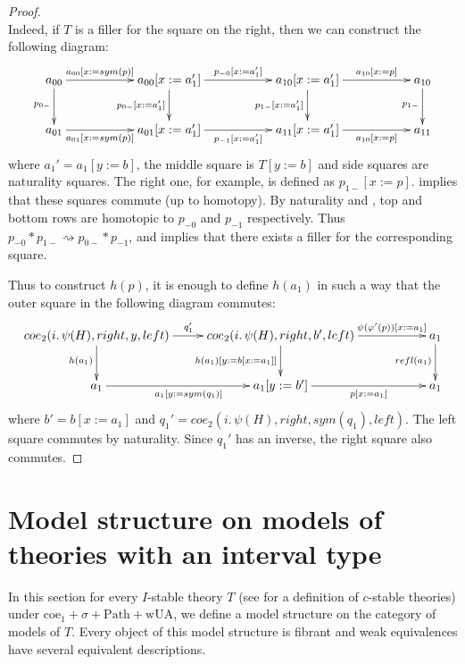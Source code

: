 \documentclass[reqno]{amsart}
\theoremstyle{definition}
\theoremstyle{remark}
\newcommand{\repl}{:=}
\newcommand{\idtype}{\rightsquigarrow}
\newcommand{\wUA}{\mathrm{wUA}}
\newcommand{\coe}{\mathrm{coe}}
\newcommand{\Path}{\mathrm{Path}}
\numberwithin{figure}{section}
\begin{document}
\begin{proof}
\[{            } \]
Indeed, if $T$ is a filler for the square on the right, then we can construct the following diagram:
\[ \xymatrix{ a_{00} \ar[rr]^-{a_{00}[x \repl sym(p)]} \ar[d]_{p_{0-}} & & a_{00}[x \repl a_1'] \ar[rr]^{p_{-0}[x \repl a_1']} \ar[d]_{p_{0-}[x \repl a_1']} & & a_{10}[x \repl a_1'] \ar[d]_{p_{1-}[x \repl a_1']} \ar[rr]^-{a_{10}[x \repl p]} & & a_{10} \ar[d]_{p_{1-}} \\
              a_{01} \ar[rr]_-{a_{01}[x \repl sym(p)]}                 & & a_{01}[x \repl a_1'] \ar[rr]_{p_{-1}[x \repl a_1']}                               & & a_{11}[x \repl a_1']                               \ar[rr]_-{a_{10}[x \repl p]} & & a_{11}
            } \]
where $a_1' = a_1[y \repl b]$, the middle square is $T[y \repl b]$ and side squares are naturality squares.
The right one, for example, is defined as $p_{1-}[x \repl p]$.
 implies that these squares commute (up to homotopy).
By naturality and , top and bottom rows are homotopic to $p_{-0}$ and $p_{-1}$ respectively.
Thus $p_{-0} * p_{1-} \idtype p_{0-} * p_{-1}$, and  implies that there exists a filler for the corresponding square.

Thus to construct $h(p)$, it is enough to define $h(a_1)$ in such a way that the outer square in the following diagram commutes:
\[ \xymatrix{ coe_2(i.\,\psi(H), right, y, left) \ar[r]^{q_1'} \ar[d]_{h(a_1)} & coe_2(i.\,\psi(H), right, b', left) \ar[rr]^-{\psi(\varphi'(p))[x \repl a_1]} \ar[d]_{h(a_1)[y \repl b[x \repl a_1]]} & & a_1 \ar[d]_{refl(a_1)} \\
              a_1 \ar[r]_{a_1[y \repl sym(q_1)]} & a_1[y \repl b'] \ar[rr]_-{p[x \repl a_1]}                                                                                                                           & & a_1
            } \]
where $b' = b[x \repl a_1]$ and $q_1' = coe_2(i.\,\psi(H), right, sym(q_1), left)$.
The left square commutes by naturality.
Since $q_1'$ has an inverse, the right square also commutes.
\end{proof}

\section{Model structure on models of theories with an interval type}
\label{sec:model-structure}

In this section for every $I$-stable theory $T$ (see \cite{alg-tt} for a definition of $c$-stable theories)
under $\coe_1 + \sigma + \Path + \wUA$, we define a model structure on the category of models of $T$.
Every object of this model structure is fibrant and weak equivalences have several equivalent descriptions.
\end{document}
